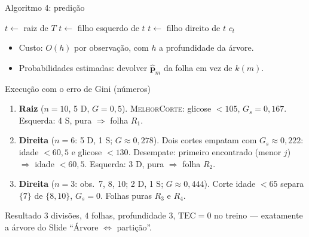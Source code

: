 \documentclass[aspectratio=169]{beamer}
\newcommand{\TEC}{\mathrm{TEC}}
\newcommand{\cS}{\textcolor{blue!70!black}{S}} %
\newcommand{\cD}{\textcolor{red!70!black}{D}}  %
\newcommand{\aPred}{4}
\begin{document}
\begin{frame}[t]{Algoritmo \aPred: predição}
\small
\begin{algorithmic}[1]
  \State $t\gets$ raiz de $T$
     \State $t\gets$ filho esquerdo de $t$
    \Else \State $t\gets$ filho direito de $t$
    \EndIf
  \EndWhile
  \State \Return $c_t$ 
\EndFunction
\end{algorithmic}
\vspace{8pt}
\begin{itemize}
  \item Custo: $O(h)$ por observação, com $h$ a profundidade da árvore.
  \item Probabilidades estimadas: devolver $\hat{\mathbf p}_m$ da folha em vez de $k(m)$.
\end{itemize}
\end{frame}

\begin{frame}{Execução com o erro de Gini (números)}
\small
\begin{enumerate}
  \item \textbf{Raiz} ($n=10$, 5 D, $G=0{,}5$). \textsc{MelhorCorte}: glicose $<105$, $G_s=0{,}167$. Esquerda: 4 \cS, pura $\Rightarrow$ folha $R_1$.
  \item \textbf{Direita} ($n=6$: 5 \cD, 1 \cS; $G\approx0{,}278$). Dois cortes empatam com $G_s\approx0{,}222$: idade $<60{,}5$ e glicose $<130$. \alert{Desempate}: primeiro encontrado (menor $j$) $\Rightarrow$ idade $<60{,}5$.
    Esquerda: 3 \cD, pura $\Rightarrow$ folha $R_2$.
  \item \textbf{Direita} ($n=3$: obs.\ 7, 8, 10; 2 \cD, 1 \cS; $G\approx0{,}444$). Corte idade $<65$ separa $\{7\}$ de $\{8,10\}$, $G_s=0$. Folhas puras $R_3$ e $R_4$.
\end{enumerate}
\vspace{4pt}
\begin{block}{Resultado}
$3$ divisões, $4$ folhas, profundidade $3$, $\TEC=0$ no treino --- exatamente a árvore do Slide ``Árvore $\Leftrightarrow$ partição''.
\end{block}
\end{frame}
\end{document}
